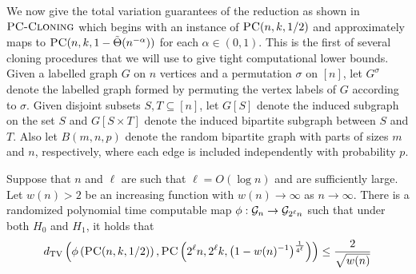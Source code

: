 \documentclass[11pt]{article}
\begin{document}
We now give the total variation guarantees of the reduction as shown in $\textsc{PC-Cloning}$ which begins with an instance of $\textsc{PC}(n, k, 1/2)$ and approximately maps to $\textsc{PC}(n, k, 1 - \tilde{\Theta}(n^{-\alpha}))$ for each $\alpha \in (0, 1)$. This is the first of several cloning procedures that we will use to give tight computational lower bounds. Given a labelled graph $G$ on $n$ vertices and a permutation $\sigma$ on $[n]$, let $G^{\sigma}$ denote the labelled graph formed by permuting the vertex labels of $G$ according to $\sigma$. Given disjoint subsets $S, T \subseteq [n]$, let $G[S]$ denote the induced subgraph on the set $S$ and $G[S \times T]$ denote the induced bipartite subgraph between $S$ and $T$. Also let $B(m, n, p)$ denote the random bipartite graph with parts of sizes $m$ and $n$, respectively, where each edge is included independently with probability $p$.

\begin{lemma}
Suppose that $n$ and $\ell$ are such that $\ell = O(\log n)$ and are sufficiently large. Let $w(n) > 2$ be an increasing function with $w(n) \to \infty$ as $n \to \infty$. There is a randomized polynomial time computable map $\phi : \mathcal{G}_n \to \mathcal{G}_{2^\ell n}$ such that under both $H_0$ and $H_1$, it holds that
$$d_{\text{TV}}\left( \phi\left(\textsc{PC}(n, k, 1/2)\right), \textsc{PC}\left(2^\ell n, 2^\ell k, \left(1 -w(n)^{-1}\right)^{\frac{1}{4^\ell}}\right) \right) \le \frac{2}{\sqrt{w(n)}}$$
\end{lemma}
\end{document}
